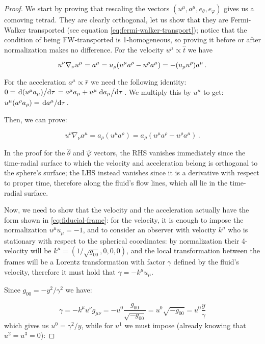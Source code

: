 \documentclass[main.tex]{subfiles}
\begin{document}
\begin{proof}
    We start by proving that rescaling the vectors \((u^\mu, a^\mu, e_\theta, e_\varphi)\) gives us a comoving tetrad. They are clearly orthogonal, let us show that they are Fermi-Walker transported (see equation \eqref{eq:fermi-walker-transport}); notice that the condition of being FW-transported is 1-homogeneous, so proving it before or after normalization makes no difference.
    For the velocity \(u^\mu \propto \hat{t}\)  we have

    \begin{equation}
        u^\nu \nabla_\nu u^\mu = a^\mu = u_\rho \qty(u^\mu a^\rho - u^\rho a^\mu) = - (u_\rho u^\rho) a^\mu \,.
    \end{equation}

    For the acceleration \(a^\mu \propto \hat{r} \) we need the following identity: \(0=\dv*{(u^\mu a_\mu)}{\tau} =a^\mu a_\mu + u^\mu \dv*{a_\mu}{\tau} \). We multiply this by \(u^\mu\) to get: \(u^\mu (a^\rho a_\rho) = \dv*{a^\mu}{\tau}\).

    Then, we can prove:

    \begin{equation}
      u^\nu \nabla_\nu a^\mu
      = a_\rho (u^\mu a^\rho)
      = a_\rho (u^\mu a^\rho - u^\rho a^\mu)\,.
    \end{equation}

    In the proof for the \(\hat{\theta} \) and \(\hat\varphi\) vectors, the RHS vanishes immediately since the time-radial surface to which the velocity and acceleration belong is orthogonal to the sphere's surface; the LHS instead vanishes since it is a derivative with respect to proper time, therefore along the fluid's flow lines, which all lie in the time-radial surface.

    Now, we need to show that the velocity and the acceleration actually have the form shown in \eqref{eq:fiducial-frame}: for the velocity, it is enough to impose the normalization \(u^\mu u_\mu = -1 \), and to consider an observer with velocity  \(k^\mu\) who is stationary with respect to the spherical coordinates: by normalization their 4-velocity will be \(k^\mu = (1/\sqrt{g_{00}}, 0,0,0)\), and the local transformation between the frames will be a Lorentz transformation with factor \(\gamma\) defined by the fluid's velocity, therefore it must hold that \(\gamma = - k^\mu u_\mu\).

    Since \(g_{00} = - y^2 / \gamma^2\) we have:

    \begin{equation}
      \gamma = - k^\mu u^\nu g_{\mu\nu} = - u^0 \frac{g_{00}}{\sqrt{-g_{00}} }
      = u^0 \sqrt{-g_{00}} = u^0 \frac{y}{\gamma}
    \end{equation}
    which gives us \(u^0 = \gamma^2 / y\), while for \(u^1\) we must impose (already knowing that \(u^2 = u^3 = 0\)):


\end{proof}
\end{document}
